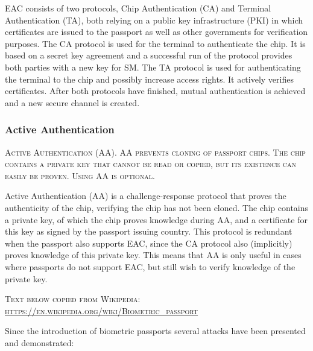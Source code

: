 EAC consists of two protocols, Chip Authentication (CA) and Terminal Authentication (TA), both relying on a public key infrastructure (PKI) in which certificates are issued to the passport as well as other governments for verification purposes. The CA protocol is used for the terminal to authenticate the chip. It is based on a secret key agreement and a successful run of the protocol provides both parties with a new key for SM. The TA protocol is used for authenticating the terminal to the chip and possibly increase access rights. It actively verifies certificates. After both protocols have finished, mutual authentication is achieved and a new secure channel is created.


\subsubsection{Active Authentication}
\textsc{Active Authentication (AA). AA prevents cloning of passport chips. The chip contains a private key that cannot be read or copied, but its existence can easily be proven. Using AA is optional.}

Active Authentication (AA) is a challenge-response protocol that proves the authenticity of the chip, verifying the chip has not been cloned. The chip contains a private key, of which the chip proves knowledge during AA, and a certificate for this key as signed by the passport issuing country. This protocol is redundant when the passport also supports EAC, since the CA protocol also (implicitly) proves knowledge of this private key. This means that AA is only useful in cases where passports do not support EAC, but still wish to verify knowledge of the private key.

\textsc{Text below copied from Wikipedia: \url{https://en.wikipedia.org/wiki/Biometric_passport}} 

Since the introduction of biometric passports several attacks have been presented and demonstrated:

